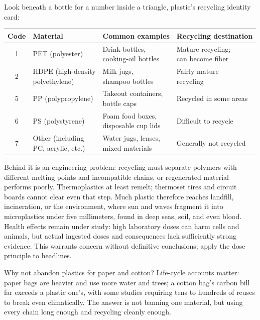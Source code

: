 Look beneath a bottle for a number inside a triangle, plastic's recycling identity card:

\begin{table}[htbp]
\centering
\begin{tabular}{clll}
\toprule
Code & Material & Common examples & Recycling destination \\
\midrule
1 & PET (polyester) & \shortstack[l]{Drink bottles,\\cooking-oil bottles} & \shortstack[l]{Mature recycling;\\can become fiber} \\
2 & \shortstack[l]{HDPE (high-density\\polyethylene)} & \shortstack[l]{Milk jugs,\\shampoo bottles} & \shortstack[l]{Fairly mature\\recycling} \\
5 & PP (polypropylene) & \shortstack[l]{Takeout containers,\\bottle caps} & Recycled in some areas \\
6 & PS (polystyrene) & \shortstack[l]{Foam food boxes,\\disposable cup lids} & Difficult to recycle \\
7 & \shortstack[l]{Other (including\\PC, acrylic, etc.)} & \shortstack[l]{Water jugs, lenses,\\mixed materials} & Generally not recycled \\
\bottomrule
\end{tabular}
\end{table}

Behind it is an engineering problem: recycling must separate polymers with different melting points and incompatible chains, or regenerated material performs poorly. Thermoplastics at least remelt; thermoset tires and circuit boards cannot clear even that step. Much plastic therefore reaches landfill, incineration, or the environment, where sun and waves fragment it into microplastics under five millimeters, found in deep seas, soil, and even blood. Health effects remain under study: high laboratory doses can harm cells and animals, but actual ingested doses and consequences lack sufficiently strong evidence. This warrants concern without definitive conclusions; apply the dose principle to headlines.

Why not abandon plastics for paper and cotton? Life-cycle accounts matter: paper bags are heavier and use more water and trees; a cotton bag's carbon bill far exceeds a plastic one's, with some studies requiring tens to hundreds of reuses to break even climatically. The answer is not banning one material, but using every chain long enough and recycling cleanly enough.

